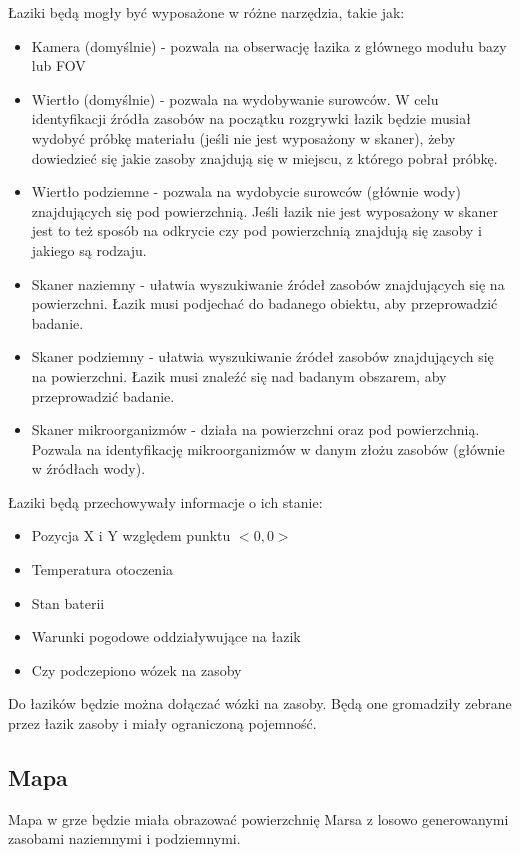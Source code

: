 \documentclass[a4paper,12pt]{article}
\begin{document}
Łaziki będą mogły być wyposażone w różne narzędzia, takie jak:
\begin{itemize}
	\item Kamera (domyślnie) - pozwala na obserwację łazika z głównego modułu bazy lub FOV
	\item Wiertło (domyślnie) - pozwala na wydobywanie surowców. W celu identyfikacji źródła zasobów na początku rozgrywki łazik będzie musiał wydobyć próbkę materiału (jeśli nie jest wyposażony w skaner), żeby dowiedzieć się jakie zasoby znajdują się w miejscu, z którego pobrał próbkę.
	\item Wiertło podziemne - pozwala na wydobycie surowców (głównie wody) znajdujących się pod powierzchnią. Jeśli łazik nie jest wyposażony w skaner jest to też sposób na odkrycie czy pod powierzchnią znajdują się zasoby i jakiego są rodzaju.
	\item Skaner naziemny - ułatwia wyszukiwanie źródeł zasobów znajdujących się na powierzchni. Łazik musi podjechać do badanego obiektu, aby przeprowadzić badanie.
	\item Skaner podziemny - ułatwia wyszukiwanie źródeł zasobów znajdujących się na powierzchni. Łazik musi znaleźć się nad badanym obszarem, aby przeprowadzić badanie.
	\item Skaner mikroorganizmów - działa na powierzchni oraz pod powierzchnią. Pozwala na identyfikację mikroorganizmów w danym złożu zasobów (głównie w źródłach wody).
\end{itemize}

Łaziki będą przechowywały informacje o ich stanie:
\begin{itemize}
	\item Pozycja X i Y względem punktu $<0,0>$
	\item Temperatura otoczenia
	\item Stan baterii
	\item Warunki pogodowe oddziaływujące na łazik
	\item Czy podczepiono wózek na zasoby
\end{itemize}

Do łazików będzie można dołączać wózki na zasoby. Będą one gromadziły zebrane przez łazik zasoby i miały ograniczoną pojemność.
\subsection{Mapa}
Mapa w grze będzie miała obrazować powierzchnię Marsa z losowo generowanymi zasobami naziemnymi i podziemnymi. 
\end{document}
